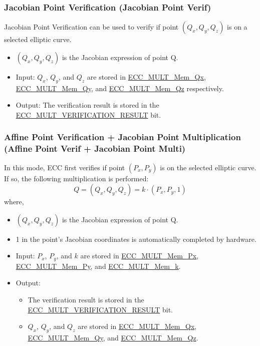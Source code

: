 \documentclass[main\_\_EN.tex]{subfiles}
\begin{document}
\subsubsection{Jacobian Point Verification (Jacobian Point Verif)}

Jacobian Point Verification can be used to verify if point $(Q_x,Q_y,Q_z)$ is on a selected elliptic curve.
\begin{itemize}
    \item $(Q_x,Q_y,Q_z)$ is the Jacobian expression of point Q.
    \item Input: $Q_x$, $Q_y$, and $Q_z$ are stored in \hyperref[tab:ecc-memory]{ECC\_MULT\_Mem\_Qx}, \hyperref[tab:ecc-memory]{ECC\_MULT\_Mem\_Qy}, and \hyperref[tab:ecc-memory]{ECC\_MULT\_Mem\_Qz} respectively.
    \item Output: The verification result is stored in the \hyperref[fielddesc:ECCMULTVERIFICATIONRESULT]{ECC\_MULT\_VERIFICATION\_RESULT} bit.
\end{itemize}

\subsubsection{Affine Point Verification + Jacobian Point Multiplication (Affine Point Verif + Jacobian Point Multi)}

In this mode, ECC first verifies if point $(P_x,P_y)$ is on the selected elliptic curve. If so, the following multiplication is performed:
\[
Q = (Q_x,Q_y,Q_z) = k \cdot (P_x,P_y,1)
\]
where,
\begin{itemize}
    \item $(Q_x,Q_y,Q_z)$ is the Jacobian expression of point Q.
    \item 1 in the point's Jacobian coordinates is automatically completed by hardware.
    \item Input: $P_x$, $P_y$, and $k$ are stored in \hyperref[tab:ecc-memory]{ECC\_MULT\_Mem\_Px}, \hyperref[tab:ecc-memory]{ECC\_MULT\_Mem\_Py}, and \hyperref[tab:ecc-memory]{ECC\_MULT\_Mem\_k}.
    \item Output:
    \begin{itemize}
        \item The verification result is stored in the \hyperref[fielddesc:ECCMULTVERIFICATIONRESULT]{ECC\_MULT\_VERIFICATION\_RESULT} bit.
        \item $Q_x$, $Q_y$, and $Q_z$ are stored in \hyperref[tab:ecc-memory]{ECC\_MULT\_Mem\_Qx}, \hyperref[tab:ecc-memory]{ECC\_MULT\_Mem\_Qy}, and \hyperref[tab:ecc-memory]{ECC\_MULT\_Mem\_Qz}.
    \end{itemize}
\end{itemize}
\end{document}
